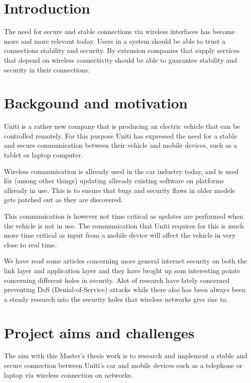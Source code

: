 \documentclass[a4paper]{article}
\begin{document}
\section{Introduction}
The need for secure and stable connections via wireless interfaces has become
more and more relevant today.  Users in a system should be able to trust a
connections stability and security. By extension companies that supply services
that depend on wireless connectivity should be able to guarantee stability
and security in their connections.


\section{Backgound and motivation}

Uniti is a rather new company that is producing an electric vehicle that can be
controlled remotely. For this purpose Uniti has expressed the need for a stable
and secure communication between their vehicle and mobile devices, such as a
tablet or laptop computer.

Wireless communication is allready used in the car industry today, and is used
för (among other things) updating allready existing software on platforms
allready in use. This is to ensure that bugs and security flaws in older models
gets patched out as they are discovered.

This communication is however not time critical as updates are performed when
the vehicle is not in use. The communication that Uniti requires for this is
much more time critical as input from a mobile device will affect the vehicle in
very close to real time.

We have read some articles\cite{NIST_report} concerning more general
internet security on both the link layer and application layer and
they have broght up som interesting points concerning different holes
in security. Alot of research have lately concerned preventing 
DoS (Denial-of-Service) attacks while there also has been always been a
steady research into the security holes that wireless networks give rise to. 


\section{Project aims and challenges}

The aim with this Master's thesis work is to research and implement a stable and
secure connection between Uniti's car and mobile devices such as a telephone or
laptop via wireless connection on networks.
\end{document}

